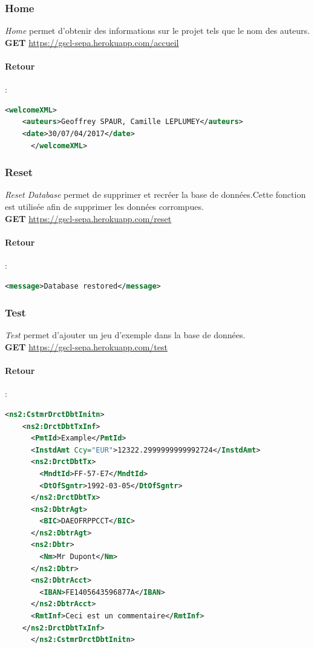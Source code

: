 \documentclass{article}
\begin{document}
      \subsubsection{Home}
	\emph{Home} permet d'obtenir des informations sur le projet tels que le nom des auteurs.\\
	\textbf{GET} \url{https://gscl-sepa.herokuapp.com/accueil}
	\paragraph{Retour}:
	  \begin{lstlisting}[language=xml]
      <welcomeXML>
	<auteurs>Geoffrey SPAUR, Camille LEPLUMEY</auteurs>
	<date>30/07/04/2017</date>
      </welcomeXML>
	  \end{lstlisting}
	
      \subsubsection{Reset}
	\emph{Reset Database} permet de supprimer et recréer la base de données.Cette fonction est utilisée afin de supprimer les données corrompues. \\
	\textbf{GET} \url{https://gscl-sepa.herokuapp.com/reset}
	\paragraph{Retour}:
	  \begin{lstlisting}[language=xml]
      <message>Database restored</message>
	  \end{lstlisting}
	
	\subsubsection{Test}
	\emph{Test} permet d'ajouter un jeu d'exemple dans la base de données. \\
	\textbf{GET} \url{https://gscl-sepa.herokuapp.com/test}
	\paragraph{Retour}:
	  \begin{lstlisting}[language=xml]
      <ns2:CstmrDrctDbtInitn>
	<ns2:DrctDbtTxInf>
	  <PmtId>Example</PmtId>
	  <InstdAmt Ccy="EUR">12322.2999999999992724</InstdAmt>
	  <ns2:DrctDbtTx>
	    <MndtId>FF-57-E7</MndtId>
	    <DtOfSgntr>1992-03-05</DtOfSgntr>
	  </ns2:DrctDbtTx>
	  <ns2:DbtrAgt>
	    <BIC>DAEOFRPPCCT</BIC>
	  </ns2:DbtrAgt>
	  <ns2:Dbtr>
	    <Nm>Mr Dupont</Nm>
	  </ns2:Dbtr>
	  <ns2:DbtrAcct>
	    <IBAN>FE1405643596877A</IBAN>
	  </ns2:DbtrAcct>
	  <RmtInf>Ceci est un commentaire</RmtInf>
	</ns2:DrctDbtTxInf>
      </ns2:CstmrDrctDbtInitn>
	  \end{lstlisting}
	
\end{document}
